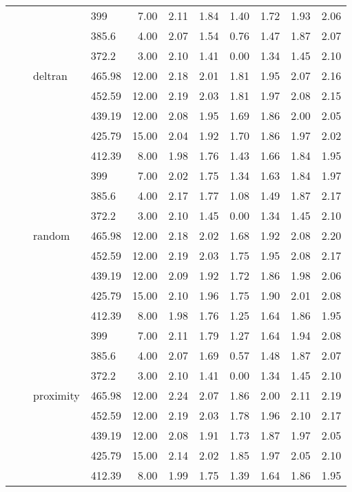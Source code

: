 \begin{longtable}{llllrrrrrrr}
   &  &  & 399 & 7.00 & 2.11 & 1.84 & 1.40 & 1.72 & 1.93 & 2.06 \\ 
   &  &  & 385.6 & 4.00 & 2.07 & 1.54 & 0.76 & 1.47 & 1.87 & 2.07 \\ 
   &  &  & 372.2 & 3.00 & 2.10 & 1.41 & 0.00 & 1.34 & 1.45 & 2.10 \\ 
   &  & deltran & 465.98 & 12.00 & 2.18 & 2.01 & 1.81 & 1.95 & 2.07 & 2.16 \\ 
   &  &  & 452.59 & 12.00 & 2.19 & 2.03 & 1.81 & 1.97 & 2.08 & 2.15 \\ 
   &  &  & 439.19 & 12.00 & 2.08 & 1.95 & 1.69 & 1.86 & 2.00 & 2.05 \\ 
   &  &  & 425.79 & 15.00 & 2.04 & 1.92 & 1.70 & 1.86 & 1.97 & 2.02 \\ 
   &  &  & 412.39 & 8.00 & 1.98 & 1.76 & 1.43 & 1.66 & 1.84 & 1.95 \\ 
   &  &  & 399 & 7.00 & 2.02 & 1.75 & 1.34 & 1.63 & 1.84 & 1.97 \\ 
   &  &  & 385.6 & 4.00 & 2.17 & 1.77 & 1.08 & 1.49 & 1.87 & 2.17 \\ 
   &  &  & 372.2 & 3.00 & 2.10 & 1.45 & 0.00 & 1.34 & 1.45 & 2.10 \\ 
   &  & random & 465.98 & 12.00 & 2.18 & 2.02 & 1.68 & 1.92 & 2.08 & 2.20 \\ 
   &  &  & 452.59 & 12.00 & 2.19 & 2.03 & 1.75 & 1.95 & 2.08 & 2.17 \\ 
   &  &  & 439.19 & 12.00 & 2.09 & 1.92 & 1.72 & 1.86 & 1.98 & 2.06 \\ 
   &  &  & 425.79 & 15.00 & 2.10 & 1.96 & 1.75 & 1.90 & 2.01 & 2.08 \\ 
   &  &  & 412.39 & 8.00 & 1.98 & 1.76 & 1.25 & 1.64 & 1.86 & 1.95 \\ 
   &  &  & 399 & 7.00 & 2.11 & 1.79 & 1.27 & 1.64 & 1.94 & 2.08 \\ 
   &  &  & 385.6 & 4.00 & 2.07 & 1.69 & 0.57 & 1.48 & 1.87 & 2.07 \\ 
   &  &  & 372.2 & 3.00 & 2.10 & 1.41 & 0.00 & 1.34 & 1.45 & 2.10 \\ 
   &  & proximity & 465.98 & 12.00 & 2.24 & 2.07 & 1.86 & 2.00 & 2.11 & 2.19 \\ 
   &  &  & 452.59 & 12.00 & 2.19 & 2.03 & 1.78 & 1.96 & 2.10 & 2.17 \\ 
   &  &  & 439.19 & 12.00 & 2.08 & 1.91 & 1.73 & 1.87 & 1.97 & 2.05 \\ 
   &  &  & 425.79 & 15.00 & 2.14 & 2.02 & 1.85 & 1.97 & 2.05 & 2.10 \\ 
   &  &  & 412.39 & 8.00 & 1.99 & 1.75 & 1.39 & 1.64 & 1.86 & 1.95 \\ 

\end{longtable}
